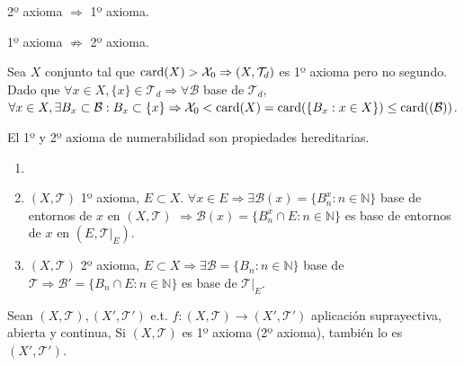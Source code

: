 \begin{obs}
  2º axioma $\Rightarrow$ 1º axioma.
\end{obs}

\begin{obs}
  1º axioma $\not \Rightarrow $ 2º axioma.

  Sea $X$ conjunto tal que $ \operatorname{card}(X) > \mathcal{X}_{0} \Rightarrow ( X, \mathcal{T}_{d} )$ es 1º axioma pero no segundo. Dado que $ \forall x \in X, \{ x \} \in \mathcal{T}_{d} \Rightarrow \forall \mathcal{B}$ base de $\mathcal{T}_{d},$ $\forall x \in X, \exists B_{x} \subset \mathcal{B} : B_{x} \subset \{ x \} \Rightarrow \mathcal{X}_0 < \operatorname{card}(X) = \operatorname{card}( \{ B_{x} : x \in X \}) \leq \operatorname{card} ((\mathcal{B}))$.
\end{obs}

\begin{prop}
  El 1º y 2º axioma de numerabilidad son propiedades hereditarias.
\end{prop}

\begin{dem}
  \begin{enumerate}[label=(\roman*)]
    \item []
    \item  $( X, \mathcal{T} )$ 1º axioma, $E \subset X$. $\forall x \in E \Rightarrow \exists \mathcal{B} (x) = \{  B_{n}^{x} : n \in \mathbb{N} \}$ base de entornos de $x$ en $( X, \mathcal{T} )$ $\Rightarrow \mathcal{B}(x) = \{  B_{n}^{x} \cap E : n \in \mathbb{N} \}$ es base de entornos de $x$ en $ ( E, \mathcal{T}|_{E})$.
    \item $( X, \mathcal{T} )$ 2º axioma, $E \subset X \Rightarrow \exists \mathcal{B} = \{ B_{n} : n \in \mathbb{N} \}$ base de $\mathcal{T} \Rightarrow \mathcal{B}' = \{  B_{n} \cap E : n \in \mathbb{N} \}$ es base de $\mathcal{T}|_{E}$.
  \end{enumerate}
\end{dem}

\begin{prop}
  Sean $( X, \mathcal{T} ), ( X', \mathcal{T}' )$ e.t. $f: ( X, \mathcal{T} ) \to ( X', \mathcal{T}' )$ aplicación suprayectiva, abierta y continua, Si $( X, \mathcal{T} )$ es 1º axioma (2º axioma), también lo es $( X', \mathcal{T}' )$.
\end{prop}

